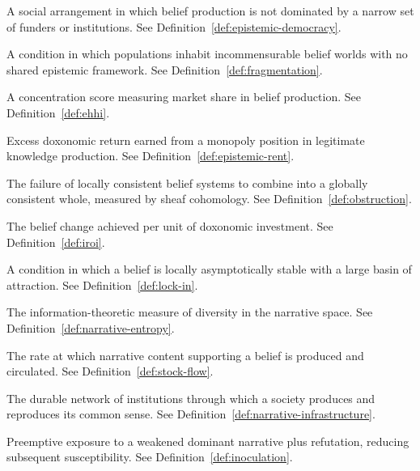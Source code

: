 \begin{description}[style=nextline, leftmargin=3cm]
\item[Epistemic democracy] A social arrangement in which belief production is not dominated by a narrow set of funders or institutions. See Definition~\ref{def:epistemic-democracy}.

\item[Epistemic fragmentation] A condition in which populations inhabit incommensurable belief worlds with no shared epistemic framework. See Definition~\ref{def:fragmentation}.

\item[Epistemic Herfindahl Index (EHI)] A concentration score measuring market share in belief production. See Definition~\ref{def:ehhi}.

\item[Epistemic rent] Excess doxonomic return earned from a monopoly position in legitimate knowledge production. See Definition~\ref{def:epistemic-rent}.

\item[Gluing obstruction] The failure of locally consistent belief systems to combine into a globally consistent whole, measured by sheaf cohomology. See Definition~\ref{def:obstruction}.

\item[Ideological ROI (IROI)] The belief change achieved per unit of doxonomic investment. See Definition~\ref{def:iroi}.

\item[Lock-in] A condition in which a belief is locally asymptotically stable with a large basin of attraction. See Definition~\ref{def:lock-in}.

\item[Narrative entropy] The information-theoretic measure of diversity in the narrative space. See Definition~\ref{def:narrative-entropy}.

\item[Narrative flow] The rate at which narrative content supporting a belief is produced and circulated. See Definition~\ref{def:stock-flow}.

\item[Narrative infrastructure] The durable network of institutions through which a society produces and reproduces its common sense. See Definition~\ref{def:narrative-infrastructure}.

\item[Narrative inoculation] Preemptive exposure to a weakened dominant narrative plus refutation, reducing subsequent susceptibility. See Definition~\ref{def:inoculation}.


\end{description}
